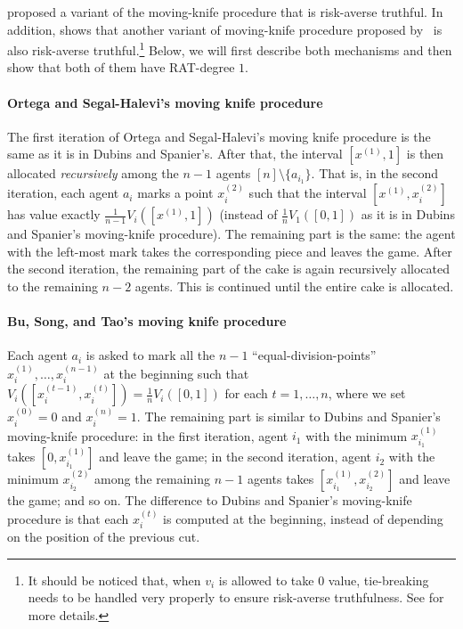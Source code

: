 \begin{toappendix}
\citet{BU2023Rat} proposed a variant of the moving-knife procedure that is risk-averse truthful.
In addition, \citet{BU2023Rat} shows that another variant of moving-knife procedure proposed by~\citet{ortega2022obvious} is also risk-averse truthful.\footnote{It should be noticed that, when $v_i$ is allowed to take $0$ value, tie-breaking needs to be handled very properly to ensure risk-averse truthfulness. See \citet{BU2023Rat} for more details.}
Below, we will first describe both mechanisms and then show that both of them have RAT-degree $1$.

\paragraph{Ortega and Segal-Halevi's moving knife procedure}
The first iteration of Ortega and Segal-Halevi's moving knife procedure is the same as it is in Dubins and Spanier's.
After that, the interval $[x^{(1)},1]$ is then allocated \emph{recursively} among the $n-1$ agents $[n]\setminus\{a_{i_1}\}$.
That is, in the second iteration, each agent $a_i$ marks a point $x_i^{(2)}$ such that the interval $[x^{(1)}, x_i^{(2)}]$ has value exactly $\frac1{n-1}V_i([x^{(1)},1])$ (instead of $\frac1nV_1([0,1])$ as it is in Dubins and Spanier's moving-knife procedure).
The remaining part is the same: the agent with the left-most mark takes the corresponding piece and leaves the game.
After the second iteration, the remaining part of the cake is again recursively allocated to the remaining $n-2$ agents.
This is continued until the entire cake is allocated.

\paragraph{Bu, Song, and Tao's moving knife procedure}
Each agent $a_i$ is asked to mark all the $n-1$ ``equal-division-points'' $x_i^{(1)},\ldots,x_i^{(n-1)}$ at the beginning such that $V_i([x_i^{(t-1)},x_i^{(t)}])=\frac1nV_i([0,1])$ for each $t=1,\ldots,n$, where we set $x_i^{(0)}=0$ and $x_i^{(n)}=1$.
The remaining part is similar to Dubins and Spanier's moving-knife procedure:
in the first iteration, agent $i_1$ with the minimum $x_{i_1}^{(1)}$ takes $[0,x_{i_1}^{(1)}]$ and leave the game; in the second iteration, agent $i_2$ with the minimum $x_{i_2}^{(2)}$ among the remaining $n-1$ agents takes $[x_{i_1}^{(1)},x_{i_2}^{(2)}]$ and leave the game; and so on.
The difference to Dubins and Spanier's moving-knife procedure is that each $x_i^{(t)}$ is computed at the beginning, instead of depending on the position of the previous cut.



\end{toappendix}
